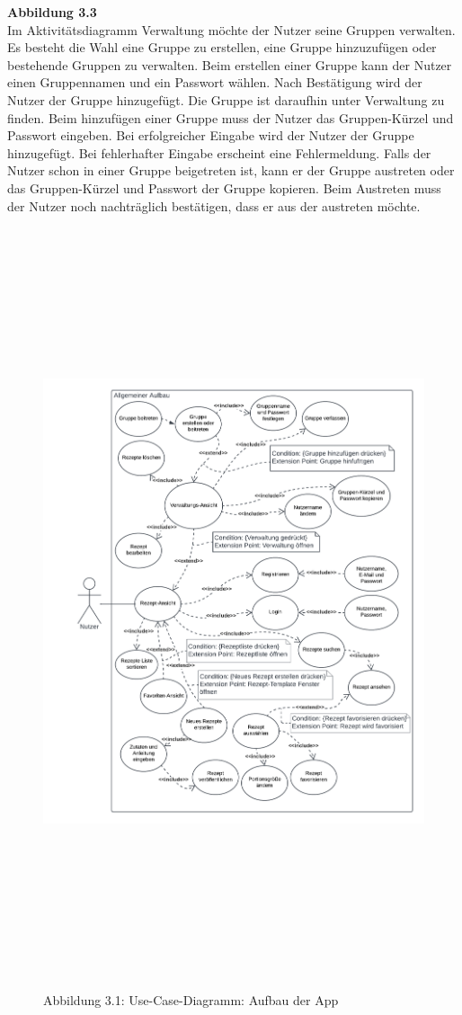 \documentclass[parskip=full]{scrartcl}
\begin{document}
\textbf{Abbildung 3.3}\\
Im Aktivitätsdiagramm Verwaltung  möchte der Nutzer seine Gruppen verwalten.
Es besteht die Wahl eine Gruppe zu erstellen, eine Gruppe hinzuzufügen oder bestehende Gruppen zu verwalten.
Beim erstellen einer Gruppe kann der Nutzer einen Gruppennamen und ein Passwort wählen.
Nach Bestätigung wird der Nutzer der Gruppe hinzugefügt.
Die Gruppe ist daraufhin unter Verwaltung zu finden.
Beim hinzufügen einer Gruppe muss der Nutzer das Gruppen-Kürzel und Passwort eingeben.
Bei erfolgreicher Eingabe wird der Nutzer der Gruppe hinzugefügt.
Bei fehlerhafter Eingabe erscheint eine Fehlermeldung.
Falls der Nutzer schon in einer Gruppe beigetreten ist, kann er der Gruppe austreten oder das Gruppen-Kürzel und Passwort der Gruppe kopieren.
Beim Austreten muss der Nutzer noch nachträglich bestätigen, dass er aus der austreten möchte.
\newpage

\begin{figure}[!htp]
    \centering
    \begin{adjustbox}{right=160mm}
        \includegraphics[height=220mm]{images/section3/Use-Case-Diagramm Aufbau App.png}
    \end{adjustbox}
    Abbildung 3.1: Use-Case-Diagramm: Aufbau der App
    \label{fig:A31}
\end{figure}
\newpage
\end{document}
